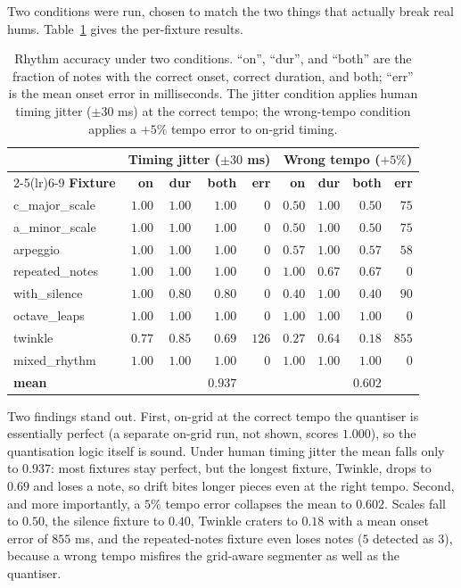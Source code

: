 \documentclass[12pt,a4paper]{article}
\begin{document}
Two conditions were run, chosen to match the two things that actually break
real hums. Table~\ref{tab:rhythm} gives the per-fixture results.

\begin{table}[H]
\centering
\caption{Rhythm accuracy under two conditions. ``on'', ``dur'', and ``both''
are the fraction of notes with the correct onset, correct duration, and both;
``err'' is the mean onset error in milliseconds. The jitter condition applies
human timing jitter ($\pm 30$ ms) at the correct tempo; the wrong-tempo
condition applies a $+5\%$ tempo error to on-grid timing.}
\label{tab:rhythm}
\begin{tabular}{l r r r r @{\hskip 1.5em} r r r r}
\toprule
 & \multicolumn{4}{c}{\textbf{Timing jitter ($\pm 30$ ms)}}
 & \multicolumn{4}{c}{\textbf{Wrong tempo ($+5\%$)}} \\
\cmidrule(lr){2-5}\cmidrule(lr){6-9}
\textbf{Fixture} & \textbf{on} & \textbf{dur} & \textbf{both} & \textbf{err} &
\textbf{on} & \textbf{dur} & \textbf{both} & \textbf{err} \\
\midrule
c\_major\_scale  & $1.00$ & $1.00$ & $1.00$ & $0$   & $0.50$ & $1.00$ & $0.50$ & $75$  \\
a\_minor\_scale  & $1.00$ & $1.00$ & $1.00$ & $0$   & $0.50$ & $1.00$ & $0.50$ & $75$  \\
arpeggio         & $1.00$ & $1.00$ & $1.00$ & $0$   & $0.57$ & $1.00$ & $0.57$ & $58$  \\
repeated\_notes  & $1.00$ & $1.00$ & $1.00$ & $0$   & $1.00$ & $0.67$ & $0.67$ & $0$   \\
with\_silence    & $1.00$ & $0.80$ & $0.80$ & $0$   & $0.40$ & $1.00$ & $0.40$ & $90$  \\
octave\_leaps    & $1.00$ & $1.00$ & $1.00$ & $0$   & $1.00$ & $1.00$ & $1.00$ & $0$   \\
twinkle          & $0.77$ & $0.85$ & $0.69$ & $126$ & $0.27$ & $0.64$ & $0.18$ & $855$ \\
mixed\_rhythm    & $1.00$ & $1.00$ & $1.00$ & $0$   & $1.00$ & $1.00$ & $1.00$ & $0$   \\
\midrule
\textbf{mean}    &        &        & $\mathbf{0.937}$ & & & & $\mathbf{0.602}$ & \\
\bottomrule
\end{tabular}
\end{table}

Two findings stand out. First, on-grid at the correct tempo the quantiser is
essentially perfect (a separate on-grid run, not shown, scores $1.000$), so the
quantisation logic itself is sound. Under human timing jitter the mean falls
only to $0.937$: most fixtures stay perfect, but the longest fixture, Twinkle,
drops to $0.69$ and loses a note, so drift bites longer pieces even at the right
tempo. Second, and more importantly, a $5\%$ tempo error collapses the mean to
$0.602$. Scales fall to $0.50$, the silence fixture to $0.40$, Twinkle craters
to $0.18$ with a mean onset error of $855$ ms, and the repeated-notes fixture
even loses notes ($5$ detected as $3$), because a wrong tempo misfires the
grid-aware segmenter as well as the quantiser.
\end{document}
